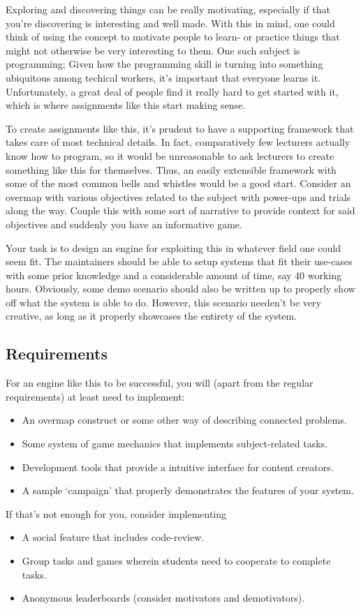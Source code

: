\begin{refsection}
Exploring and discovering things can be really motivating, especially if that you're discovering is interesting and well made. With this in mind, one could think of using the concept to motivate people to learn- or practice things that might not otherwise be very interesting to them. One such subject is programming; Given how the programming skill is turning into something ubiquitous among techical workers, it's important that everyone learns it. Unfortunately, a great deal of people find it really hard to get started with it, which is where assignments like this start making sense.

To create assignments like this, it's prudent to have a supporting framework that takes care of most technical details. In fact, comparatively few lecturers actually know how to program, so it would be unreasonable to ask lecturers to create something like this for themselves. Thus, an easily extensible framework with some of the most common bells and whistles would be a good start. Consider an overmap with various objectives related to the subject with power-ups and trials along the way. Couple this with some sort of narrative to provide context for said objectives and suddenly you have an informative game.

Your task is to design an engine for exploiting this in whatever field one could seem fit. The maintainers should be able to setup systems that fit their use-cases with some prior knowledge and a considerable amount of time, say 40 working hours. Obviously, some demo scenario should also be written up to properly show off what the system is able to do. However, this scenario needen't be very creative, as long as it properly showcases the entirety of the system.

\subsection*{Requirements}
For an engine like this to be successful, you will (apart from the regular requirements) at least need to implement:
\begin{itemize}
    \item An overmap construct or some other way of describing connected problems.
    \item Some system of game mechanics that implements subject-related tasks.
    \item Development tools that provide a intuitive interface for content creators.
    \item A sample `campaign' that properly demonstrates the features of your system.
\end{itemize}
If that's not enough for you, consider implementing
\begin{itemize}
    \item A social feature that includes code-review.
    \item Group tasks and games wherein students need to cooperate to complete tasks.
    \item Anonymous leaderboards (consider motivators and demotivators).
\end{itemize}

\end{refsection}
